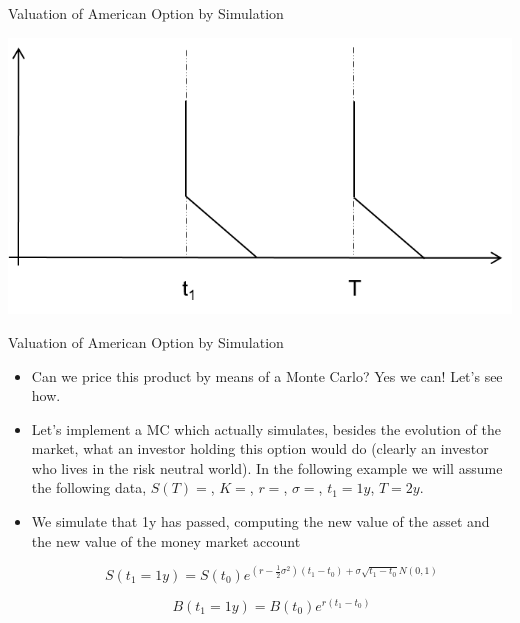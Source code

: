 \documentclass[11pt]{beamer}
\begin{document}
\begin{frame}{Valuation of American Option by Simulation}
\begin{center}
\includegraphics[scale=1]{img/bermudan_exercise_2.png} 
\end{center}
\end{frame}
\begin{frame}{Valuation of American Option by Simulation}
\begin{itemize}
\item Can we price this product by means of a Monte Carlo? Yes we can! Let's see how.

\item Let's implement a MC which actually simulates, besides the evolution of the market, what an investor holding this option would do (clearly an investor who lives in the risk neutral world). In the following example we will assume the following data, $S(T)=$, $K=$, $r=$, $\sigma=$, $t_1=1y$, $T=2y$.

\item We simulate that 1y has passed, computing the new value of the asset and the new value of the money market account

$$S(t_1 = 1y) = S(t_0)e^{(r-\frac{1}{2}\sigma^2 )(t_1-t_0) + \sigma \sqrt{t_1-t_0}N(0,1)}$$

$$B(t_1 = 1y) = B(t_0) e^{r(t_1-t_0)}$$

\end{itemize}
\end{frame}
\end{document}
